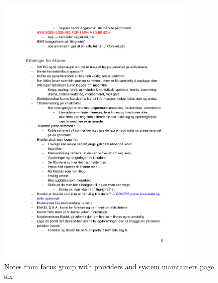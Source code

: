 \begin{figure}[H]
\centering
    \includegraphics[width=0.85\textwidth]{fig/workshop/providers/WSTilbydere_6.pdf}
    \caption{Notes from focus group with providers and system maintainers page six}
    \label{Provider_6}
\end{figure}

